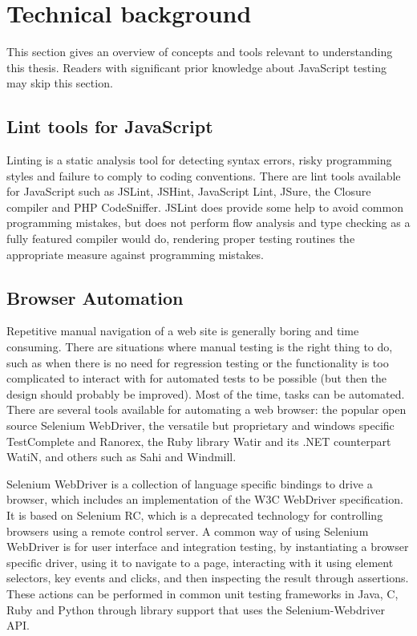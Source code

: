 \documentclass[11pt]{article}
\begin{document}
\section{Technical background}

This section gives an overview of concepts and tools relevant to understanding this thesis. Readers with significant prior knowledge about JavaScript testing may skip this section.

\subsection{Lint tools for JavaScript}
\label{sec:Lint}

Linting is a static analysis tool for detecting syntax errors, risky programming styles and failure to comply to coding conventions. There are lint tools available for JavaScript such as JSLint, JSHint, JavaScript Lint, JSure, the Closure compiler and PHP CodeSniffer. JSLint does provide some help to avoid common programming mistakes, but does not perform flow analysis\cite{JSLint} and type checking as a fully featured compiler would do, rendering proper testing routines the appropriate measure against programming mistakes.

\subsection{Browser Automation}
\label{sec:browserautomation}

Repetitive manual navigation of a web site is generally boring and time consuming. There are situations where manual testing is the right thing to do, such as when there is no need for regression testing or the functionality is too complicated to interact with for automated tests to be possible (but then the design should probably be improved). Most of the time, tasks can be automated. There are several tools available for automating a web browser: the popular open source Selenium WebDriver, the versatile but proprietary and windows specific TestComplete and Ranorex, the Ruby library Watir and its .NET counterpart WatiN, and others such as Sahi and Windmill.

Selenium WebDriver is a collection of language specific bindings to drive a browser, which includes an implementation of the W3C WebDriver specification. It is based on Selenium RC, which is a deprecated technology for controlling browsers using a remote control server. A common way of using Selenium WebDriver is for user interface and integration testing, by instantiating a browser specific driver, using it to navigate to a page, interacting with it using element selectors, key events and clicks, and then inspecting the result through assertions. These actions can be performed in common unit testing frameworks in Java, C\nolinebreak\hspace{-.05em}\raisebox{.3ex}{\scriptsize\bf \#}, Ruby and Python through library support that uses the Selenium-Webdriver API. \cite{Selenium}
\end{document}
